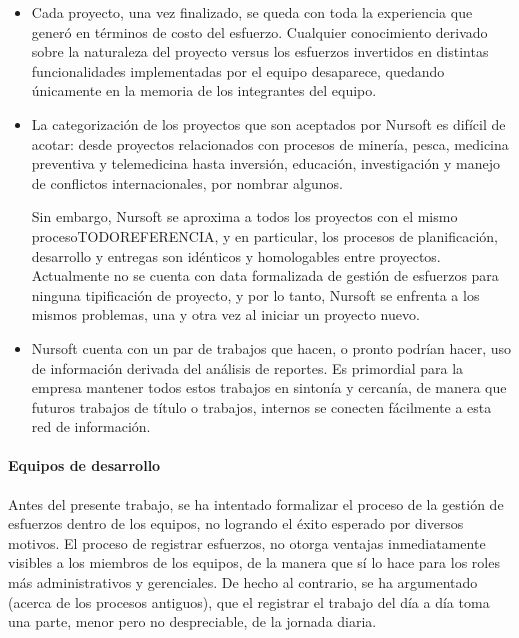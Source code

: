 \begin{itemize}
  \item Cada proyecto, una vez finalizado, se queda con toda la experiencia que generó
  en términos de costo del esfuerzo. Cualquier conocimiento derivado sobre
  la naturaleza del proyecto versus los esfuerzos invertidos en distintas 
  funcionalidades implementadas por el equipo desaparece, quedando únicamente en
  la memoria de los integrantes del equipo. 
  \item La categorización de los proyectos que son aceptados por Nursoft es 
  difícil de acotar: desde proyectos relacionados con procesos de minería, pesca,
  medicina preventiva y telemedicina hasta inversión, educación, investigación y
  manejo de conflictos internacionales, por nombrar algunos. 

  Sin embargo, Nursoft se aproxima a todos los proyectos con el mismo procesoTODOREFERENCIA,
  y en particular, los procesos de planificación, desarrollo y entregas son 
  idénticos y homologables entre proyectos. Actualmente no se cuenta con data
  formalizada de gestión de esfuerzos para ninguna tipificación de proyecto, y
  por lo tanto, Nursoft se enfrenta a los mismos problemas, una y otra vez al iniciar un
  proyecto nuevo.
  \item Nursoft cuenta con un par de trabajos\cite{morales_2019}\cite{mas'ad_2019} que hacen,
  o pronto podrían hacer, uso de información derivada del análisis de reportes.
  Es primordial para la empresa mantener todos estos trabajos en sintonía y cercanía,
  de manera que futuros trabajos de título o trabajos, internos se conecten
  fácilmente a esta red de información.
  
\end{itemize}

\paragraph{Equipos de desarrollo}

Antes del presente trabajo, se ha intentado formalizar el proceso de la gestión
de esfuerzos dentro de los equipos, no logrando el éxito esperado por diversos
motivos. El proceso de registrar esfuerzos, no otorga ventajas
inmediatamente visibles a los miembros de los equipos, de la manera que sí lo hace
para los roles más administrativos y gerenciales. De hecho al contrario, se ha
argumentado (acerca de los procesos antiguos), que el registrar el trabajo del
día a día toma una parte, menor pero no despreciable, de la jornada diaria.

